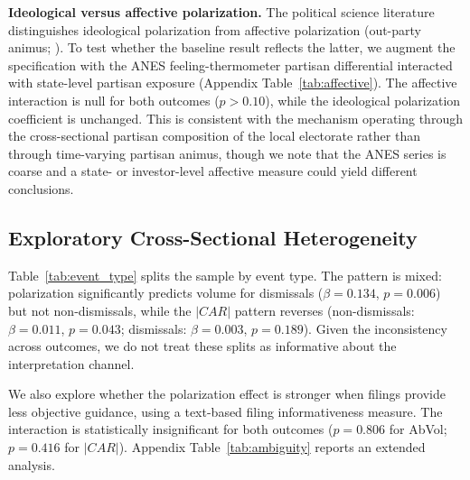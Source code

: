 \documentclass[12pt]{article}
\begin{document}




\textbf{Ideological versus affective polarization.}
The political science literature distinguishes ideological polarization
from affective polarization (out-party animus; \citealp{iyengar2012,
iyengar2019}). To test whether the baseline result reflects the latter,
we augment the specification with the ANES feeling-thermometer partisan
differential interacted with state-level partisan exposure (Appendix
Table~\ref{tab:affective}). The affective interaction is null for both
outcomes ($p > 0.10$), while the ideological polarization coefficient is
unchanged. This is consistent with the mechanism operating through the
cross-sectional partisan composition of the local electorate rather than
through time-varying partisan animus, though we note that the ANES series
is coarse and a state- or investor-level affective measure could yield
different conclusions.

\subsection{Exploratory Cross-Sectional Heterogeneity}
\label{sec:exploratory}

Table~\ref{tab:event_type} splits the sample by event type. The pattern
is mixed: polarization significantly predicts volume for dismissals
($\beta = 0.134$, $p = 0.006$) but not non-dismissals, while the
$|CAR|$ pattern reverses (non-dismissals: $\beta = 0.011$, $p = 0.043$;
dismissals: $\beta = 0.003$, $p = 0.189$). Given the inconsistency
across outcomes, we do not treat these splits as informative about the
interpretation channel.



We also explore whether the polarization effect is stronger when filings
provide less objective guidance, using a text-based filing informativeness
measure. The interaction is statistically insignificant for both outcomes
($p = 0.806$ for AbVol; $p = 0.416$ for $|CAR|$).
Appendix Table~\ref{tab:ambiguity} reports an extended analysis.
\end{document}
